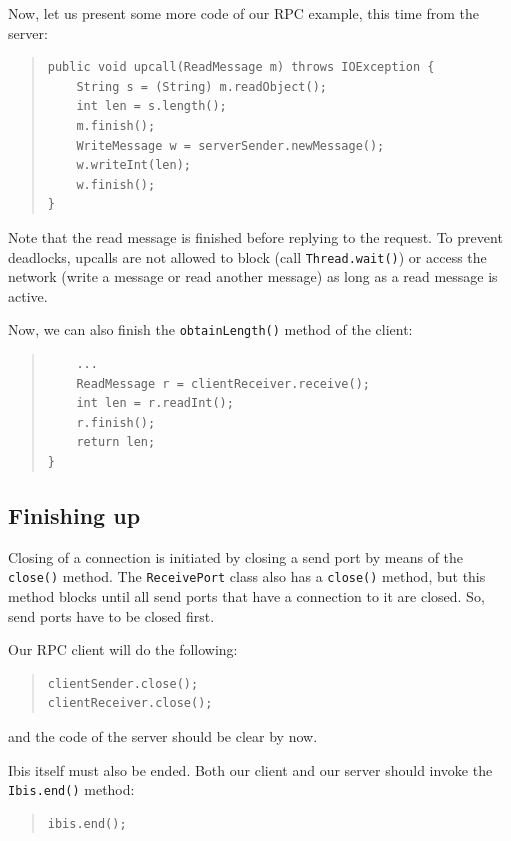 \documentclass[10pt]{article}
\begin{document}
Now, let us present some more code of our RPC example, this time
from the server:

\begin{quote}
\begin{verbatim}
public void upcall(ReadMessage m) throws IOException {
    String s = (String) m.readObject();
    int len = s.length();
    m.finish();
    WriteMessage w = serverSender.newMessage();
    w.writeInt(len);
    w.finish();
}
\end{verbatim}
\end{quote}

\noindent
Note that the read message is finished before replying to the
request. To prevent deadlocks, upcalls are not allowed to block
(call \texttt{Thread.wait()}) or access the network (write a message or
read another message) as long as a read message is active.

Now, we can also finish the \texttt{obtainLength()} method of the client:
\begin{quote}
\begin{verbatim}
    ...
    ReadMessage r = clientReceiver.receive();
    int len = r.readInt();
    r.finish();
    return len;
}
\end{verbatim}
\end{quote}

\subsection{Finishing up}

Closing of a connection is initiated by closing a send port
by means of the \texttt{close()} method. The \texttt{ReceivePort}
class also has a \texttt{close()} method, but this method blocks
until all send ports that have a connection to it are closed.
So, send ports have to be closed first.

Our RPC client will do the following:

\begin{quote}
\begin{verbatim}
clientSender.close();
clientReceiver.close();
\end{verbatim}
\end{quote}
and the code of the server should be clear by now.

Ibis itself must also be ended. Both our client and our server
should invoke the \texttt{Ibis.end()} method:
\begin{quote}
\begin{verbatim}
ibis.end();
\end{verbatim}
\end{quote}
\end{document}
